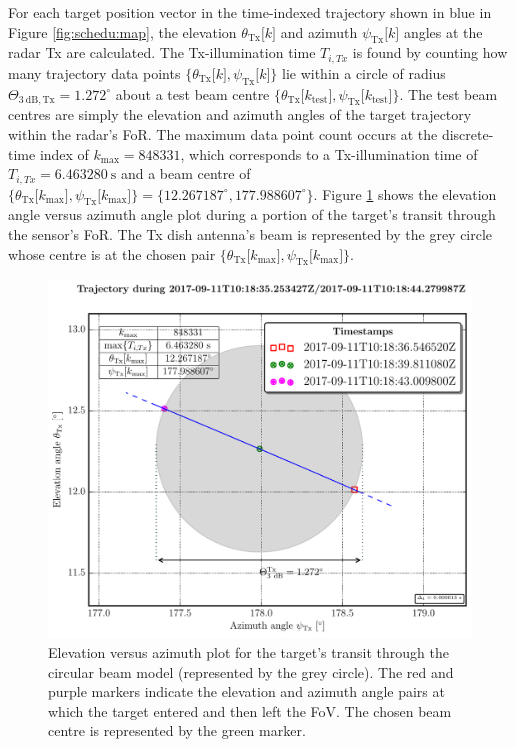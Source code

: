 \documentclass[conference]{IEEEtran}
\begin{document}
For each target position vector in the time-indexed trajectory shown in blue in Figure \ref{fig:schedu:map}, the elevation $\theta_{\text{Tx}} \lbrack k \rbrack$ and azimuth $\psi_{\text{Tx}}\lbrack k \rbrack$ angles at the radar Tx are calculated. The Tx-illumination time $T_{i,Tx}$ is found by counting how many trajectory data points $\{ \theta_{\text{Tx}}\lbrack k \rbrack,\psi_{\text{Tx}}\lbrack k \rbrack\}$ lie within a circle of radius $\Theta_{3~\mathrm{dB},\text{Tx}}=1.272^\circ$ about a test beam centre $\{ \theta_{\text{Tx}}\lbrack k_{\text{test}} \rbrack,\psi_{\text{Tx}}\lbrack k_{\text{test}} \rbrack \}$. The test beam centres are simply the elevation and azimuth angles of the target trajectory within the radar's FoR. The maximum data point count occurs at the discrete-time index of $k_{\text{max}}=848331$, which corresponds to a Tx-illumination time of $ T_{i,Tx} = 6.463280~\mathrm{s} $ and a beam centre of $\{ \theta_{\text{Tx}}\lbrack k_{\text{max}} \rbrack,\psi_{\text{Tx}}\lbrack k_{\text{max}} \rbrack \} = \{ 12.267187^\circ, 177.988607^\circ \}$. Figure \ref{fig:schedu:schedu:tx:beamcirc} shows the elevation angle versus azimuth angle plot during a portion of the target's transit through the sensor's FoR. The Tx dish antenna's beam is represented by the grey circle whose centre is at the chosen pair $\{ \theta_{\text{Tx}}\lbrack k_{\text{max}} \rbrack,\psi_{\text{Tx}}\lbrack k_{\text{max}} \rbrack \}$.

\begin{figure}[ht]
	\centering
	\includegraphics[scale=0.49]{main057iss08txbeamcirc0test.pdf}
	\caption[Transmitter beam centre pointing: circular beam model]{Elevation versus azimuth plot for the target's transit through the circular beam model (represented by the grey circle). The red and purple markers indicate the elevation and azimuth angle pairs at which the target entered and then left the FoV. The chosen beam centre is represented by the green marker. }
	\label{fig:schedu:schedu:tx:beamcirc}
\end{figure}
\end{document}
